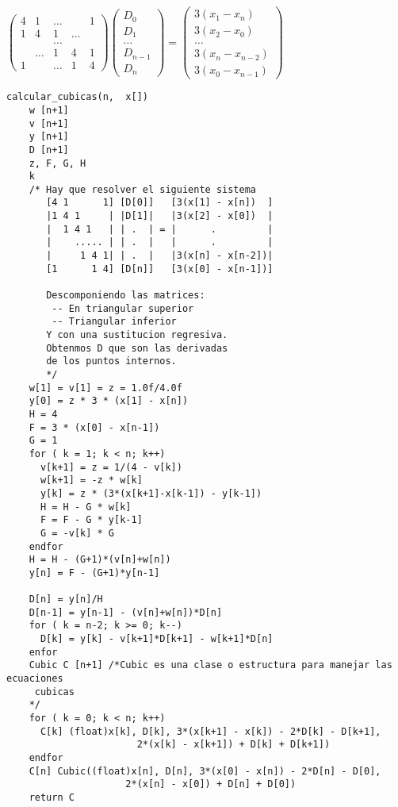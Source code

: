 $
\left(\begin{array}{ccccc}
4 & 1 & \dots &  &1\\
1 & 4 & 1 & \dots & \\
  &   & \dots & &\\
 & \dots & 1 & 4 & 1\\
1 & &\dots  & 1 & 4
\end{array}\right)
\left(\begin{array}{c}
D_0\\
D_1\\
\ldots\\
D_{n-1}\\
D_n
\end{array}\right) =
\left(\begin{array}{c}
3(x_1 - x_n)\\
3(x_2 - x_0)\\
\ldots\\
3(x_n - x_{n-2})\\
3(x_0 - x_{n-1})
\end{array}\right)
$
\begin{verbatim}
calcular_cubicas(n,  x[])
    w [n+1]
    v [n+1]
    y [n+1]
    D [n+1]
    z, F, G, H
    k
    /* Hay que resolver el siguiente sistema
       [4 1      1] [D[0]]   [3(x[1] - x[n])  ]
       |1 4 1     | |D[1]|   |3(x[2] - x[0])  |
       |  1 4 1   | | .  | = |      .         |
       |    ..... | | .  |   |      .         |
       |     1 4 1| | .  |   |3(x[n] - x[n-2])|
       [1      1 4] [D[n]]   [3(x[0] - x[n-1])]

       Descomponiendo las matrices:
        -- En triangular superior
        -- Triangular inferior
       Y con una sustitucion regresiva.
       Obtenmos D que son las derivadas
       de los puntos internos.
       */
    w[1] = v[1] = z = 1.0f/4.0f
    y[0] = z * 3 * (x[1] - x[n])
    H = 4
    F = 3 * (x[0] - x[n-1])
    G = 1
    for ( k = 1; k < n; k++)
      v[k+1] = z = 1/(4 - v[k])
      w[k+1] = -z * w[k]
      y[k] = z * (3*(x[k+1]-x[k-1]) - y[k-1])
      H = H - G * w[k]
      F = F - G * y[k-1]
      G = -v[k] * G
    endfor
    H = H - (G+1)*(v[n]+w[n])
    y[n] = F - (G+1)*y[n-1]

    D[n] = y[n]/H
    D[n-1] = y[n-1] - (v[n]+w[n])*D[n]
    for ( k = n-2; k >= 0; k--)
      D[k] = y[k] - v[k+1]*D[k+1] - w[k+1]*D[n]
    enfor
    Cubic C [n+1] /*Cubic es una clase o estructura para manejar las ecuaciones
     cubicas
    */
    for ( k = 0; k < n; k++)
      C[k] (float)x[k], D[k], 3*(x[k+1] - x[k]) - 2*D[k] - D[k+1],
                       2*(x[k] - x[k+1]) + D[k] + D[k+1])
    endfor
    C[n] Cubic((float)x[n], D[n], 3*(x[0] - x[n]) - 2*D[n] - D[0],
                     2*(x[n] - x[0]) + D[n] + D[0])
    return C

\end{verbatim}
